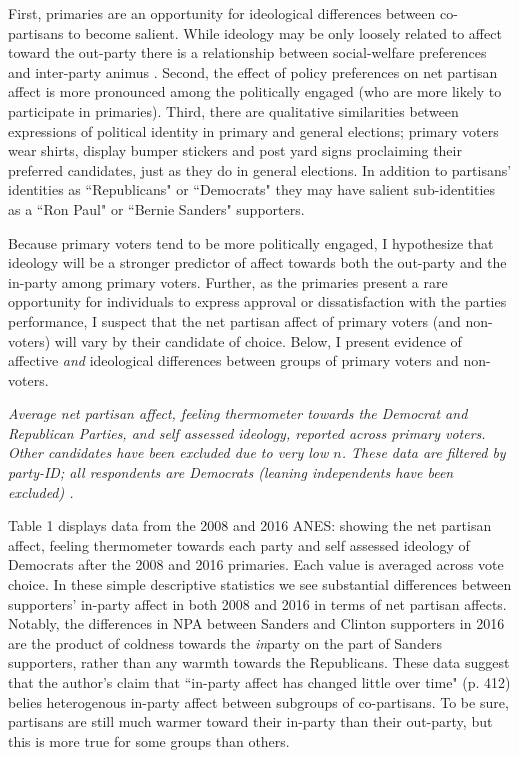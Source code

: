 \documentclass[12pt]{article}
\begin{document}
 First, primaries are an opportunity for ideological differences between co-partisans to become salient. While ideology may be only loosely related to affect toward the out-party there is a relationship between social-welfare preferences and inter-party animus \citep[p. 423]{iyengar2012affect}. Second, the effect of policy preferences on net partisan affect is more pronounced among the politically engaged (who are more likely to participate in primaries). Third, there are qualitative similarities between expressions of political identity in primary and general elections; primary voters wear shirts, display bumper stickers and post yard signs proclaiming their preferred candidates, just as they do in general elections. In addition to partisans' identities as  ``Republicans" or ``Democrats" they may have salient sub-identities as a ``Ron Paul" or ``Bernie Sanders" supporters.
 
Because primary voters tend to be more politically engaged, I hypothesize that ideology will be a stronger predictor of affect towards both the out-party and the in-party among primary voters. Further, as the primaries present a rare opportunity for individuals to express approval or dissatisfaction with the parties performance, I suspect that the net partisan affect of primary voters (and non-voters) will vary by their candidate of choice. Below, I present evidence of affective \textit{and} ideological differences between groups of primary voters and non-voters.


 \begin{table}[h!]

\caption{\label{table} \textit{Average net partisan affect, feeling thermometer towards the Democrat and Republican Parties, and self assessed ideology, reported across primary voters. Other candidates have been excluded due to very low $n$. These data are filtered by party-ID; all respondents are Democrats (leaning independents have been excluded)
.}}
\end{table}

Table 1 displays data from the 2008 and 2016 ANES: showing the net partisan affect, feeling thermometer towards each party and self assessed ideology of Democrats after the 2008 and 2016 primaries. Each value is averaged across vote choice. In these simple descriptive statistics we see substantial differences between supporters' in-party affect in both 2008 and 2016 in terms of net partisan affects. Notably, the differences in NPA between Sanders and Clinton supporters in 2016 are the product of coldness towards the \textit{in}party on the part of Sanders supporters, rather than any warmth towards the Republicans. These data suggest that the author's claim that ``in-party affect has changed little over time" (p. 412) belies heterogenous in-party affect between subgroups of co-partisans. To be sure, partisans are still much warmer toward their in-party than their out-party, but this is more true for some groups than others. 
\end{document}
